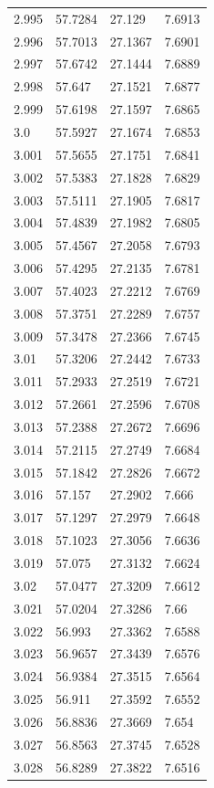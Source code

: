 \begin{tabular}{llll}
2.995 & 57.7284 & 27.129 & 7.6913 \\
2.996 & 57.7013 & 27.1367 & 7.6901 \\
2.997 & 57.6742 & 27.1444 & 7.6889 \\
2.998 & 57.647 & 27.1521 & 7.6877 \\
2.999 & 57.6198 & 27.1597 & 7.6865 \\
3.0 & 57.5927 & 27.1674 & 7.6853 \\
3.001 & 57.5655 & 27.1751 & 7.6841 \\
3.002 & 57.5383 & 27.1828 & 7.6829 \\
3.003 & 57.5111 & 27.1905 & 7.6817 \\
3.004 & 57.4839 & 27.1982 & 7.6805 \\
3.005 & 57.4567 & 27.2058 & 7.6793 \\
3.006 & 57.4295 & 27.2135 & 7.6781 \\
3.007 & 57.4023 & 27.2212 & 7.6769 \\
3.008 & 57.3751 & 27.2289 & 7.6757 \\
3.009 & 57.3478 & 27.2366 & 7.6745 \\
3.01 & 57.3206 & 27.2442 & 7.6733 \\
3.011 & 57.2933 & 27.2519 & 7.6721 \\
3.012 & 57.2661 & 27.2596 & 7.6708 \\
3.013 & 57.2388 & 27.2672 & 7.6696 \\
3.014 & 57.2115 & 27.2749 & 7.6684 \\
3.015 & 57.1842 & 27.2826 & 7.6672 \\
3.016 & 57.157 & 27.2902 & 7.666 \\
3.017 & 57.1297 & 27.2979 & 7.6648 \\
3.018 & 57.1023 & 27.3056 & 7.6636 \\
3.019 & 57.075 & 27.3132 & 7.6624 \\
3.02 & 57.0477 & 27.3209 & 7.6612 \\
3.021 & 57.0204 & 27.3286 & 7.66 \\
3.022 & 56.993 & 27.3362 & 7.6588 \\
3.023 & 56.9657 & 27.3439 & 7.6576 \\
3.024 & 56.9384 & 27.3515 & 7.6564 \\
3.025 & 56.911 & 27.3592 & 7.6552 \\
3.026 & 56.8836 & 27.3669 & 7.654 \\
3.027 & 56.8563 & 27.3745 & 7.6528 \\
3.028 & 56.8289 & 27.3822 & 7.6516 \\

\end{tabular}
